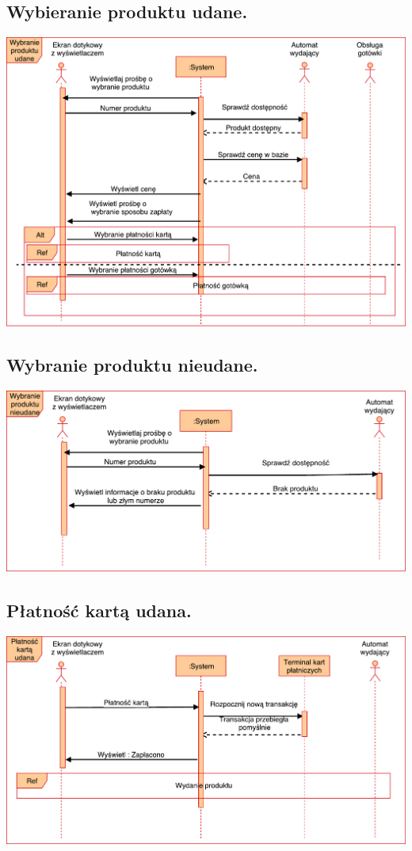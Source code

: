 \documentclass[11pt]{article}
\begin{document}
		\subsection{Wybieranie produktu udane.}
		\begin{center}
			\includegraphics[scale=0.65]{WybranieProduktuUdane.pdf}
		\end{center}
		\subsection{Wybranie produktu nieudane.}
		\begin{center}
			\includegraphics[scale=0.65]{WybranieProduktuNieudane.pdf}
		\end{center}
		\newpage
		\subsection{Płatność kartą udana.}
		\begin{center}
			\includegraphics[scale=0.65]{PlatnoscKartaUdana.pdf}
		\end{center}
\end{document}
